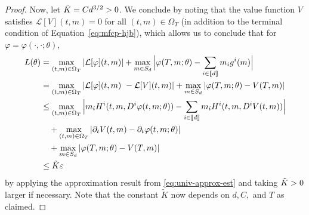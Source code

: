 \documentclass[11pt,reqno]{amsart}
\numberwithin{equation}{section}
\theoremstyle{plain}
\newcommand{\sL}{\mathcal{L}}
\newcommand{\lbrs}[1]{\llbracket #1 \rrbracket}
\begin{document}
\begin{proof}
Now, let $\Tilde{K} = C d^{3/2} > 0$. We conclude by noting that the value function $V$ satisfies $\sL[V](t,m) = 0$ for all $(t,m) \in \Omega_T$ (in addition to the terminal condition of Equation~\eqref{eq:mfcp-hjb}), which allows us to conclude that for $\varphi=\varphi(\cdot,\cdot;\theta)$,
\begin{align*}
    L(\theta) &= \max_{(t,m) \in \Omega_T}\left|\sL[\varphi](t,m)\right| + \max_{m \in S_d}\Big|\varphi(T, m; \theta) - \sum_{i \in \lbrs{d}} m_i g^i(m)\Big| \\
    &= \max_{(t,m) \in \Omega_T}\left|\sL[\varphi](t,m)\ - \sL[V](t,m)\right|+ \max_{m \in S_d}\left|\varphi(T, m; \theta) - V(T, m)\right|\\
    &\leq \max_{(t,m) \in \Omega_T}\Big|m_i H^i(t, m, D^i \varphi(t, m; \theta)) - \sum_{i \in \lbrs{d}} m_i H^i(t, m, D^i V(t, m))\Big| \\
    &\quad + \max_{(t,m) \in \Omega_T}\left|\partial_t V(t,m) - \partial_t \varphi(t,m;\theta)\right|\\
    &\quad + \max_{m \in S_d}\left|\varphi(T, m; \theta) - V(T, m)\right|\\
    &\leq \Tilde{K} \varepsilon
\end{align*}
by applying the approximation result from \eqref{eq:univ-approx-est} and taking $\Tilde{K} > 0$ larger if necessary. Note that the constant $\tilde{K}$ now depends on $d, C,$ and $T$ as claimed.
\end{proof}
\end{document}
